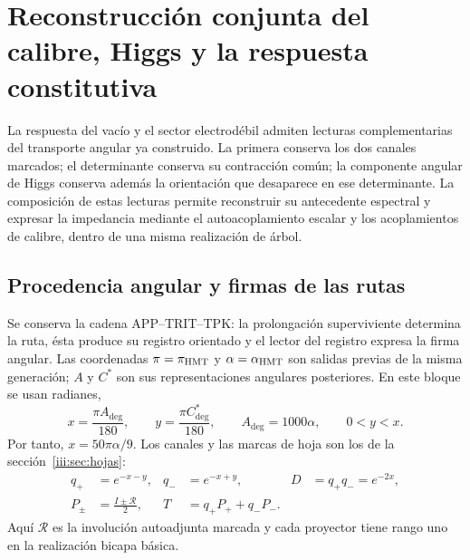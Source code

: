 \section{Reconstrucción conjunta del calibre, Higgs y la respuesta constitutiva}
\label{amp-higgs-seccion}

La respuesta del vacío y el sector electrodébil admiten lecturas complementarias
del transporte angular ya construido. La primera conserva los dos canales
marcados; el determinante conserva su contracción común; la componente angular
de Higgs conserva además la orientación que desaparece en ese determinante.
La composición de estas lecturas permite reconstruir su antecedente espectral
y expresar la impedancia mediante el autoacoplamiento escalar y los acoplamientos
de calibre, dentro de una misma realización de árbol.

\subsection{Procedencia angular y firmas de las rutas}

Se conserva la cadena APP--TRIT--TPK: la prolongación superviviente determina
la ruta, ésta produce su registro orientado y el lector del registro expresa
la firma angular. Las coordenadas $\pi=\pi_{\rm HMT}$ y
$\alpha=\alpha_{\rm HMT}$ son salidas previas de la misma generación;
$A$ y $C^*$ son sus representaciones angulares posteriores. En este bloque se
usan radianes,
\begin{equation}
 x=\frac{\pi A_{\deg}}{180},\qquad
 y=\frac{\pi C^*_{\deg}}{180},\qquad
 A_{\deg}=1000\alpha,\qquad 0<y<x.
 \label{amp-higgs-angulos}
\end{equation}
Por tanto, $x=50\pi\alpha/9$. Los canales y las marcas de hoja son los
de la sección~\ref{iii:sec:hojas}:
\begin{equation}
 \begin{aligned}
 q_+&=e^{-x-y},& q_-&=e^{-x+y},& D&=q_+q_-=e^{-2x},\\
 P_\pm&=\frac{I\pm\mathcal R}{2},&
 T&=q_+P_++q_-P_-.
 \end{aligned}
 \label{amp-higgs-transporte}
\end{equation}
Aquí $\mathcal R$ es la involución autoadjunta marcada y cada proyector
tiene rango uno en la realización bicapa básica.

